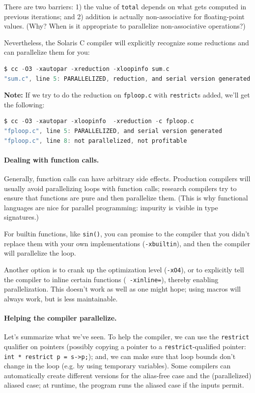 \documentclass[a4paper]{report}
\begin{document}
There are two barriers: 1) the value of {\tt total} depends on what
gets computed in previous iterations; and 2) addition is actually
non-associative for floating-point values. ({\sf Why? When is it
appropriate to parallelize non-associative operations?})

\newpage
Nevertheless, the Solaris C compiler will explicitly recognize
some reductions and can parallelize them for you:
{
\begin{lstlisting}[language=C]
$ cc -O3 -xautopar -xreduction -xloopinfo sum.c
"sum.c", line 5: PARALLELIZED, reduction, and serial version generated
\end{lstlisting}
}

{\bf Note:}  If we try to do the reduction on {\tt fploop.c} with {\tt restrict}s added, we'll get the following:
\begin{lstlisting}[language=C]
$ cc -O3 -xautopar -xloopinfo  -xreduction -c fploop.c
"fploop.c", line 5: PARALLELIZED, and serial version generated
"fploop.c", line 8: not parallelized, not profitable
\end{lstlisting}

\paragraph{Dealing with function calls.} Generally, function calls
can have arbitrary side effects. Production compilers will usually
avoid parallelizing loops with function calls; research compilers try
to ensure that functions are pure and then parallelize them.
(This is why functional languages are nice for parallel
programming: impurity is visible in type signatures.)

For builtin functions, like {\tt sin()}, you can promise to the 
compiler that you didn't replace them with your own implementations
({\tt -xbuiltin}), and then the compiler will parallelize the loop.

Another option is to crank up the optimization level ({\tt -xO4}), or
to explicitly tell the compiler to inline certain functions ({\tt
  -xinline=}), thereby enabling parallelization. This doesn't work as
well as one might hope; using macros will always work, but is less maintainable.

\paragraph{Helping the compiler parallelize.} Let's summarize what we've
seen. To help the compiler, we can use the {\tt restrict} qualifier on
pointers (possibly copying a pointer to a {\tt restrict}-qualified
pointer: {\tt int * restrict p = s->p;}); and, we can make sure that
loop bounds don't change in the loop (e.g. by using temporary
variables). Some compilers can automatically create different versions
for the alias-free case and the (parallelized) aliased case; at
runtime, the program runs the aliased case if the inputs permit.
\end{document}
